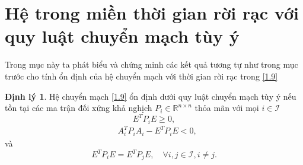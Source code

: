 \documentclass[12pt,a4paper]{report}
\theoremstyle{definition}
\newtheorem{dl}{Định lý}
\theoremstyle{definition}
\numberwithin{dl}{chapter}
\numberwithin{vd}{chapter}
\numberwithin{corollary}{chapter}
\numberwithin{lemma}{chapter}
\numberwithin{md}{chapter}
\numberwithin{dn}{chapter}
\numberwithin{cy}{chapter}
\numberwithin{nx}{chapter}
\begin{document}
\section{Hệ trong miền thời gian rời rạc với quy luật chuyển mạch tùy ý}
Trong mục này ta phát biểu và chứng minh các kết quả tương tự như trong mục trước cho tính ổn định của hệ chuyển mạch với thời gian rời rạc trong \eqref{1.9} 
\begin{dl}\label{dl2.3} Hệ chuyển mạch \eqref{1.9} ổn định dưới quy luật chuyển mạch tùy ý nếu tồn tại các ma trận đối xứng khả nghịch $P_{i} \in \mathbb{R}^{n \times n}$ thỏa mãn với mọi $i \in \mathcal{I}$
\begin{equation}\label{2.44}
E^{T} P_{i} E \geq 0 ,
\end{equation}
\begin{equation}\label{2.45}
\begin{aligned}
& A_{i}^{T} P_{i} A_{i}-E^{T} P_{i} E<0,
\end{aligned} 
\end{equation}
và
\begin{equation}\label{2.46}
E^{T} P_{i} E=E^{T} P_{j} E, \quad \forall i, j \in \mathcal{I}, i \neq j.
\end{equation}
\end{dl}
\end{document}
